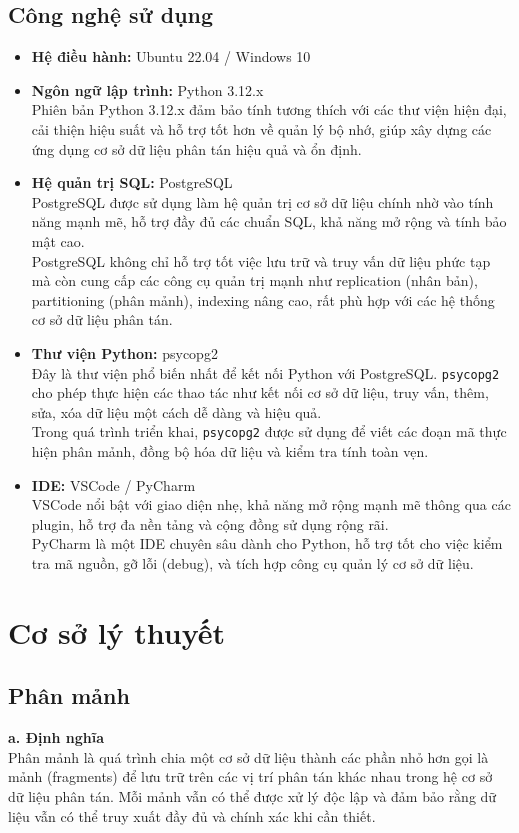 \documentclass[14pt]{extarticle}
\begin{document}
\subsection{Công nghệ sử dụng}
\begin{itemize}
    \item \textbf{Hệ điều hành:} Ubuntu 22.04 / Windows 10
    \item \textbf{Ngôn ngữ lập trình:} Python 3.12.x\\
    Phiên bản Python 3.12.x đảm bảo tính tương thích với các thư viện hiện đại, cải thiện hiệu suất và hỗ trợ tốt hơn về quản lý bộ nhớ, giúp xây dựng các ứng dụng cơ sở dữ liệu phân tán hiệu quả và ổn định.
    \item \textbf{Hệ quản trị SQL:} PostgreSQL\\
    PostgreSQL được sử dụng làm hệ quản trị cơ sở dữ liệu chính nhờ vào tính năng mạnh mẽ, hỗ trợ đầy đủ các chuẩn SQL, khả năng mở rộng và tính bảo mật cao.\\
    PostgreSQL không chỉ hỗ trợ tốt việc lưu trữ và truy vấn dữ liệu phức tạp mà còn cung cấp các công cụ quản trị mạnh như replication (nhân bản), partitioning (phân mảnh), indexing nâng cao, rất phù hợp với các hệ thống cơ sở dữ liệu phân tán.
    \item \textbf{Thư viện Python:} psycopg2\\
    Đây là thư viện phổ biến nhất để kết nối Python với PostgreSQL. \texttt{psycopg2} cho phép thực hiện các thao tác như kết nối cơ sở dữ liệu, truy vấn, thêm, sửa, xóa dữ liệu một cách dễ dàng và hiệu quả.\\
    Trong quá trình triển khai, \texttt{psycopg2} được sử dụng để viết các đoạn mã thực hiện phân mảnh, đồng bộ hóa dữ liệu và kiểm tra tính toàn vẹn.
    \item \textbf{IDE:} VSCode / PyCharm\\
    VSCode nổi bật với giao diện nhẹ, khả năng mở rộng mạnh mẽ thông qua các plugin, hỗ trợ đa nền tảng và cộng đồng sử dụng rộng rãi.\\
    PyCharm là một IDE chuyên sâu dành cho Python, hỗ trợ tốt cho việc kiểm tra mã nguồn, gỡ lỗi (debug), và tích hợp công cụ quản lý cơ sở dữ liệu.
\end{itemize}


\clearpage
\section{Cơ sở lý thuyết}

\subsection{Phân mảnh}
\textbf{a. Định nghĩa}\\
Phân mảnh là quá trình chia một cơ sở dữ liệu thành các phần nhỏ hơn gọi là mảnh (fragments) để lưu trữ trên các vị trí phân tán khác nhau trong hệ cơ sở dữ liệu phân tán. Mỗi mảnh vẫn có thể được xử lý độc lập và đảm bảo rằng dữ liệu vẫn có thể truy xuất đầy đủ và chính xác khi cần thiết.
\end{document}
